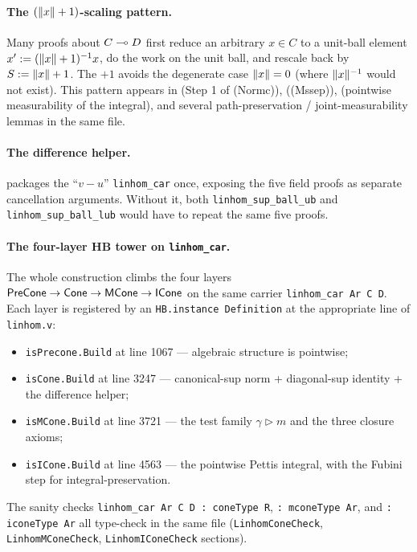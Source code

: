 \paragraph{The \texorpdfstring{$(\lVert x \rVert + 1)$}{(x + 1)}-scaling pattern.}
Many proofs about $C \multimap D$ first reduce an arbitrary $x \in C$
to a unit-ball element $x' := (\lVert x \rVert + 1)^{-1} x$, do the
work on the unit ball, and rescale back by $S := \lVert x \rVert + 1$.
The $+1$ avoids the degenerate case $\lVert x \rVert = 0$ (where
$\lVert x \rVert^{-1}$ would not exist). This pattern appears in
 (Step 1 of (Normc)),
 ((Mssep)),
 (pointwise
measurability of the integral), and several path-preservation /
joint-measurability lemmas in the same file.

\paragraph{The difference helper.}
 packages the
``$v - u$'' \texttt{linhom\_car} once, exposing the five field
proofs as separate cancellation arguments. Without it, both
\texttt{linhom\_sup\_ball\_ub} and \texttt{linhom\_sup\_ball\_lub}
would have to repeat the same five proofs.

\paragraph{The four-layer HB tower on \texttt{linhom\_car}.}
The whole construction climbs the four layers
$\mathsf{PreCone} \to \mathsf{Cone} \to \mathsf{MCone} \to \mathsf{ICone}$ on the same carrier
\texttt{linhom\_car Ar C D}. Each layer is registered by an
\texttt{HB.instance Definition} at the appropriate line of
\texttt{linhom.v}:
\begin{itemize}
\item \texttt{isPrecone.Build} at line 1067 --- algebraic structure
  is pointwise;
\item \texttt{isCone.Build} at line 3247 --- canonical-sup norm +
  diagonal-sup identity + the difference helper;
\item \texttt{isMCone.Build} at line 3721 --- the test family
  $\gamma \triangleright m$ and the three closure axioms;
\item \texttt{isICone.Build} at line 4563 --- the pointwise Pettis
  integral, with the Fubini step for integral-preservation.
\end{itemize}
The sanity checks
\verb|linhom_car Ar C D : coneType R|,
\verb|: mconeType Ar|, and
\verb|: iconeType Ar|
all type-check in the same file (\texttt{LinhomConeCheck},
\texttt{LinhomMConeCheck}, \texttt{LinhomIConeCheck} sections).
